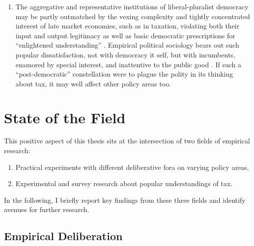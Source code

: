 \begin{enumerate}
	\item The aggregative and representative institutions of liberal-pluralist democracy may be partly outmatched by the vexing complexity \citep{Merton-1968-aa} and tightly concentrated interest \citep{Olson-1971-aa} of late market economies, such as in taxation, violating both their input and output legitimacy \citep{Scharpf1997} as well as basic democratic prescriptions for ``enlightened understanding'' \citep{Dahl-1989-aa}.
	Empirical political sociology bears out such popular dissatisfaction, not with democracy it self, but with incumbents, enamored by special interest, and inattentive to the public good \citep{NyeJr.1997,Norris2011,PutnamPharr-2000-aa}.
	If such a ``post-democratic'' constellation \citep{Crouch2004} were to plague the polity in its thinking about tax, it may well affect other policy areas too.
\end{enumerate}

\section{State of the Field}
This positive aspect of this thesis sits at the intersection of two fields of empirical research:
\begin{enumerate}
	\item Practical experiments with different deliberative fora on varying policy areas,


	\item Experimental and survey research about popular understandings of tax.
\end{enumerate}

In the following, I briefly report key findings from these three fields and identify avenues for further research.


\subsection{Empirical Deliberation}

